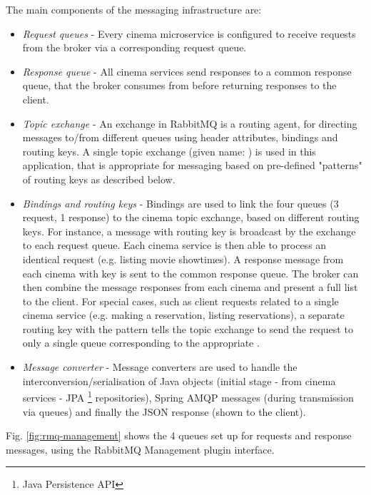 The main components of the messaging infrastructure are:
\begin{itemize}
	\item \textit{Request queues} - Every cinema microservice is configured to receive requests from the broker via a corresponding request queue.
	\item \textit{Response queue} - All cinema services send responses to a common response queue, that the broker consumes from before returning responses to the client.
	\item \textit{Topic exchange} - An exchange in RabbitMQ is a routing agent, for directing messages to/from different queues using header attributes, bindings and routing keys. A single topic exchange (given name: ) is used in this application, that is appropriate for messaging based on pre-defined "patterns" of routing keys as described below.
	\item \textit{Bindings and routing keys} - Bindings are used to link the four queues (3 request, 1 response) to the cinema topic exchange, based on different routing keys. For instance, a message with routing key  is broadcast by the exchange to each request queue. Each cinema service is then able to process an identical request (e.g. listing movie showtimes). A response message from each cinema with key  is sent to the common response queue. The broker can then combine the message responses from each cinema and present a full list to the client. For special cases, such as client requests related to a single cinema service (e.g. making a reservation, listing reservations), a separate routing key with the pattern  tells the topic exchange to send the request to only a single queue corresponding to the appropriate .
	\item \textit{Message converter} - Message converters are used to handle the interconversion/serialisation of Java objects (initial stage - from cinema services - JPA \footnote{Java Persistence API} repositories), Spring AMQP messages (during transmission via queues) and finally the JSON response (shown to the client).
\end{itemize}

Fig. \ref{fig:rmq-management} shows the 4 queues set up for requests and response messages, using the RabbitMQ Management plugin interface.

